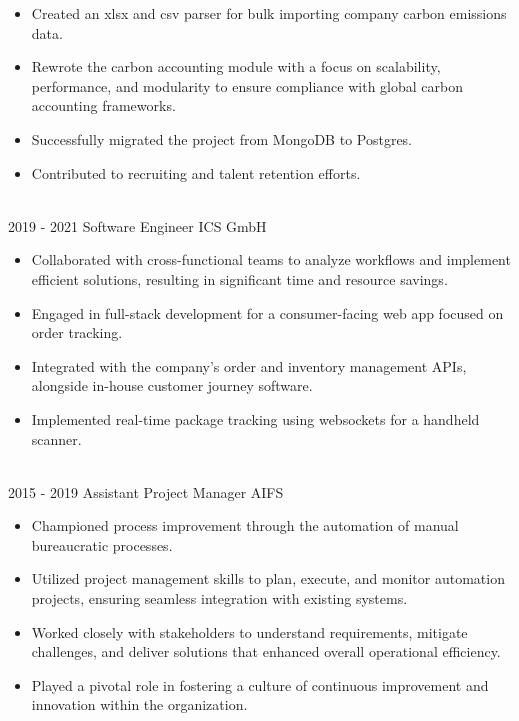 \begin{entrylist}
{        \begin{itemize}[noitemsep,topsep=0pt,parsep=0pt,partopsep=0pt, leftmargin=-1pt]
          \item Created an xlsx and csv parser for bulk importing company carbon emissions data.
          \item Rewrote the carbon accounting module with a focus on scalability, performance, and modularity to ensure compliance with global carbon accounting frameworks.
          \item Successfully migrated the project from MongoDB to Postgres.
          \item Contributed to recruiting and talent retention efforts.
        \end{itemize} 
        }\\
	\entry
		{2019 - 2021}
		{Software Engineer}
		{ICS GmbH}
		{\vspace{-10pt}
        \begin{itemize}[noitemsep,topsep=0pt,parsep=0pt,partopsep=0pt, leftmargin=-1pt]
        \item Collaborated with cross-functional teams to analyze workflows and implement efficient solutions, resulting in significant time and resource savings.
          \item    Engaged in full-stack development for a consumer-facing web app focused on order tracking.
          \item    Integrated with the company's order and inventory management APIs, alongside in-house customer journey software.
          \item    Implemented real-time package tracking using websockets for a handheld scanner.
        \end{itemize} 
        }\\
	\entry
		{2015 - 2019}
		{Assistant Project Manager}
		{AIFS}
		{\vspace{-10pt}
        \begin{itemize}[noitemsep,topsep=0pt,parsep=0pt,partopsep=0pt, leftmargin=-1pt]
          \item  Championed process improvement through the automation of manual bureaucratic processes.
            \item Utilized project management skills to plan, execute, and monitor automation projects, ensuring seamless integration with existing systems.
            \item Worked closely with stakeholders to understand requirements, mitigate challenges, and deliver solutions that enhanced overall operational efficiency.
            \item Played a pivotal role in fostering a culture of continuous improvement and innovation within the organization.
        \end{itemize} 
        }
\end{entrylist}
